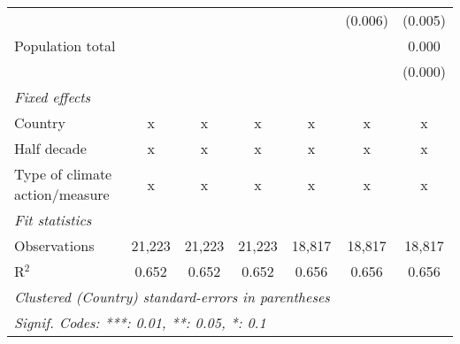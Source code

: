 \begin{tabular}{lcccccc}
                                              &             &                &                &                & (0.006)       & (0.005)\\   
   Population total                           &             &                &                &                &               & 0.000\\   
                                              &             &                &                &                &               & (0.000)\\   
   \emph{Fixed effects}\\
   Country                                    & x           & x              & x              & x              & x             & x\\  
   Half decade                                & x           & x              & x              & x              & x             & x\\  
   Type of climate action/measure             & x           & x              & x              & x              & x             & x\\  
   \midrule \emph{Fit statistics}\\
   Observations                               & 21,223      & 21,223         & 21,223         & 18,817         & 18,817        & 18,817\\  
   R$^2$                                      & 0.652       & 0.652          & 0.652          & 0.656          & 0.656         & 0.656\\  
   \midrule
   \multicolumn{7}{l}{\emph{Clustered (Country) standard-errors in parentheses}}\\
   \multicolumn{7}{l}{\emph{Signif. Codes: ***: 0.01, **: 0.05, *: 0.1}}\\
\end{tabular}
\par\endgroup


